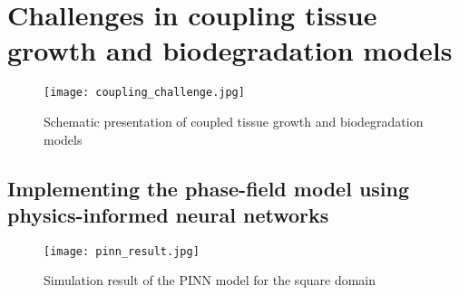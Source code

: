 \section{Challenges in coupling tissue growth and biodegradation models}


\begin{figure}
\medskip
\centering
\texttt{[image: coupling\_challenge.jpg]}
\caption[Schematic presentation of coupled tissue growth and biodegradation models]{Schematic presentation of coupled tissue growth and biodegradation models}
\label{fig:tissue_coupling_challenge}
\end{figure}


\begin{subappendices}

\section{Implementing the phase-field model using physics-informed neural networks}


\begin{figure}
\medskip
\centering
\texttt{[image: pinn\_result.jpg]}
\caption[Simulation result of the PINN model for the square domain]{Simulation result of the PINN model for the square domain}
\label{fig:tissue_pinn_result}
\end{figure}



\end{subappendices}

\cleardoublepage


